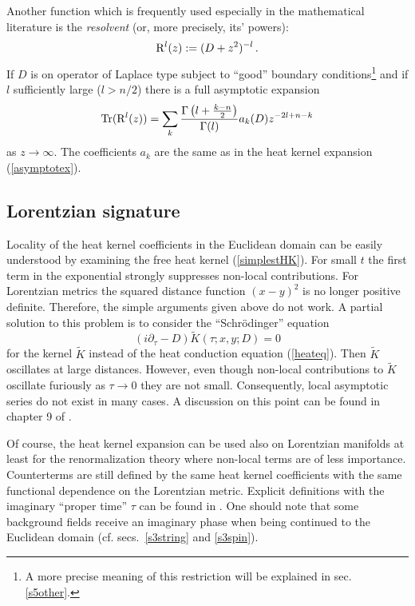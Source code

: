 Another function which is frequently used especially in the mathematical
literature is the {\it resolvent} (or, more precisely, its' powers):
\begin{equation}
{\rm R}^l(z):=(D+z^2)^{-l} \,.\label{resolvent}
\end{equation}
If $D$ is on operator of Laplace type subject to ``good''
boundary conditions\footnote{A more precise meaning of this 
restriction will be explained in sec. \ref{s5other}.}
 and if $l$ sufficiently large ($l>n/2$)
there is a full asymptotic expansion
\begin{equation}
{\rm Tr} ({\rm R}^l(z))=\sum_k 
\frac{\Gamma \left( l+\frac{k-n}2 \right)}{\Gamma (l)}
a_k(D) z^{-2l+n-k} \label{asresol}
\end{equation} 
as $z\to \infty$. The coefficients $a_k$ are the same as in the
heat kernel expansion (\ref{asymptotex}).
\subsection{Lorentzian signature}\label{s2Lorentz}
Locality of the heat kernel coefficients in the Euclidean domain
can be easily understood by examining the free heat kernel
(\ref{simplestHK}). For small $t$ the first term in the exponential
strongly suppresses non-local contributions. For Lorentzian 
metrics the squared distance function $(x-y)^2$ is no longer
positive definite. Therefore, the simple arguments given above
do not work. A partial solution to this problem is to consider
the ``Schr\"{o}dinger'' equation
\begin{equation}
\left( i\partial_\tau -D \right) \tilde K(\tau;x,y;D)=0
\label{Schr}
\end{equation}
for the kernel $\tilde K$ instead of the heat conduction
equation (\ref{heateq}). Then $\tilde K$ oscillates at large
distances. However, even though non-local contributions
to $\tilde K$ oscillate furiously as $\tau\to 0$ they are
not small. Consequently, local asymptotic series do not
exist in many cases. A discussion on this point
can be found in chapter 9 of \cite{Fulling:1989nb}.

Of course, the heat kernel expansion can be used also
on Lorentzian manifolds at least for the renormalization
theory where non-local terms are of less importance.
Counterterms are still defined by the same heat kernel
coefficients with the same functional dependence on
the Lorentzian metric. Explicit definitions with the imaginary
``proper time'' $\tau$ can be found in 
\cite{DeWitt:1965,Birrell:1982ix}. One should note that some
background fields receive an imaginary phase when being
continued to the Euclidean domain (cf. secs.\ \ref{s3string}
and \ref{s3spin}).

